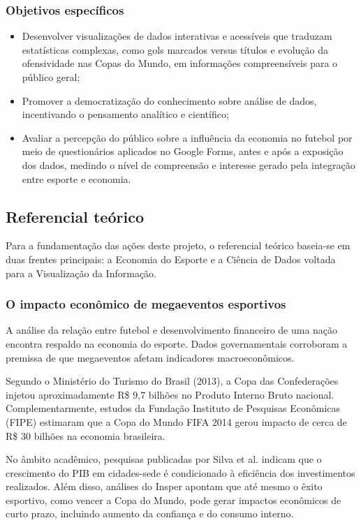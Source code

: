 \documentclass[12pt, a4paper, brazil]{article}
\begin{document}
\subsubsection{Objetivos específicos}
\begin{itemize}
    \item Desenvolver visualizações de dados interativas e acessíveis que traduzam estatísticas complexas, como gols marcados versus títulos e evolução da ofensividade nas Copas do Mundo, em informações compreensíveis para o público geral;
    \item Promover a democratização do conhecimento sobre análise de dados, incentivando o pensamento analítico e científico;
    \item Avaliar a percepção do público sobre a influência da economia no futebol por meio de questionários aplicados no Google Forms, antes e após a exposição dos dados, medindo o nível de compreensão e interesse gerado pela integração entre esporte e economia.
\end{itemize}

\subsection{Referencial teórico}
Para a fundamentação das ações deste projeto, o referencial teórico baseia-se em duas frentes principais: a Economia do Esporte e a Ciência de Dados voltada para a Visualização da Informação.

\subsubsection{O impacto econômico de megaeventos esportivos}
A análise da relação entre futebol e desenvolvimento financeiro de uma nação encontra respaldo na economia do esporte. Dados governamentais corroboram a premissa de que megaeventos afetam indicadores macroeconômicos.

Segundo o Ministério do Turismo do Brasil (2013), a Copa das Confederações injetou aproximadamente R\$ 9,7 bilhões no Produto Interno Bruto nacional. Complementarmente, estudos da Fundação Instituto de Pesquisas Econômicas (FIPE) estimaram que a Copa do Mundo FIFA 2014 gerou impacto de cerca de R\$ 30 bilhões na economia brasileira.

No âmbito acadêmico, pesquisas publicadas por Silva et al. indicam que o crescimento do PIB em cidades-sede é condicionado à eficiência dos investimentos realizados. Além disso, análises do Insper apontam que até mesmo o êxito esportivo, como vencer a Copa do Mundo, pode gerar impactos econômicos de curto prazo, incluindo aumento da confiança e do consumo interno.
\end{document}
